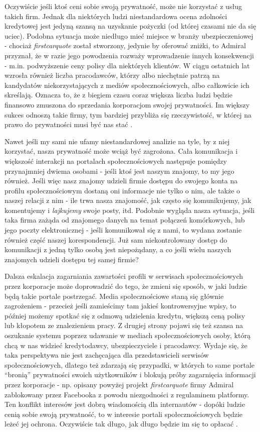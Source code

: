 \documentclass[polish]{kbk}
\begin{document}
Oczywiście jeśli ktoś ceni sobie swoją prywatność, może nie korzystać z usług takich firm. Jednak dla niektórych ludzi niestandardowa ocena zdolności kredytowej jest jedyną szansą na uzyskanie pożyczki (od której czasami nie da się uciec). Podobna sytuacja może niedługo mieć miejsce w branży ubezpieczeniowej - chociaż \textit{firstcarquote} został stworzony, jedynie by oferować zniżki, to Admiral przyznał, że w razie jego powodzenia rozważy wprowadzenie innych konsekwencji - m.in. podwyższenie ceny polisy dla niektórych klientów. W ciągu ostatnich lat wzrosła również liczba pracodawców, którzy albo niechętnie patrzą na kandydatów niekorzystających z mediów społecznościowych, albo całkowicie ich skreślają. Oznacza to, że z biegiem czasu coraz większa liczba ludzi będzie finansowo zmuszona do sprzedania korporacjom swojej prywatności. Im większy sukces odnoszą takie firmy, tym bardziej przybliża się rzeczywistość, w której na prawo do prywatności musi być nas stać \cite{guardian-stop}.

Nawet jeśli my sami nie ufamy niestandardowej analizie na tyle, by z niej korzystać, nasza prywatność może wciąż być zagrożona. Cała komunikacja i większość interakcji na portalach społecznościowych następuje pomiędzy przynajmniej dwiema osobami - jeśli ktoś jest naszym znajomy, to my jego również. Jeśli więc nasz znajomy udzieli firmie dostępu do swojego konta na profilu społecznościowym dostaną oni informacje nie tylko o nim, ale także o naszej relacji z nim - ile trwa nasza znajomość, jak często się komunikujemy, jak komentujemy i \textit{lajkujemy} swoje posty, itd. Podobnie wygląda nasza sytuacja, jeśli taka firma zażąda od znajomego danych na temat połączeń komórkowych, lub jego poczty elektronicznej - jeśli komunikował się z nami, to wydana zostanie również część naszej korespondencji. Już sam niekontrolowany dostęp do komunikacji z jedną tylko osobą jest niepożądany, a co jeśli wielu naszych znajomych udzieli dostępu tej samej firmie?

Dalsza eskalacja zagarniania zawartości profili w serwisach społecznościowych przez korporacje może doprowadzić do tego, że zmieni się sposób, w jaki ludzie będą takie portale postrzegać. Media społecznościowe staną się głównie zagrożeniem - przecież jeśli zamieścimy tam jakieś kontrowersyjne wpisy, to później możemy spotkać się z odmową udzielenia kredytu, większą ceną polisy lub kłopotem ze znalezieniem pracy. Z drugiej strony pojawi się też szansa na oszukanie systemu poprzez udawanie w mediach społecznościowych osoby, którą chcą w nas widzieć kredytodawcy, ubezpieczyciele i pracodawcy. Wydaje się, że taka perspektywa nie jest zachęcająca dla przedstawicieli serwisów społecznościowych, dlatego też zdarzają się przypadki, w których to same portale ``bronią'' prywatności swoich użytkowników i blokują próby zagarnięcia informacji przez korporacje - np. opisany powyżej projekt \textit{firstcarquote} firmy Admiral zablokowany przez Facebooka z powodu niezgodności z regulaminem platformy. Ten konflikt interesów jest dobrą wiadomością dla internautów - dopóki ludzie cenią sobie swoją prywatność, to w interesie portali społecznościowych będzie leżeć jej ochrona. Oczywiście tak długo, jak długo będzie im się to opłacać \cite{guardian-stop}.
\end{document}
